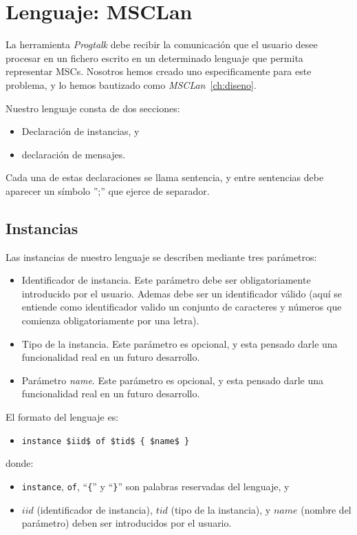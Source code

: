 \chapter{Lenguaje: MSCLan}
\label{ch:lenguaje}

La herramienta \textit{Progtalk} debe recibir la comunicación que el
usuario desee procesar en un fichero escrito en un determinado
lenguaje que permita representar MSCs. Nosotros hemos creado uno
especificamente para este problema, y lo hemos bautizado como
\textit{MSCLan}~\ref{ch:diseno}.

Nuestro lenguaje consta de dos secciones:
\begin{itemize}
\item Declaración de instancias, y
\item declaración de mensajes.
\end{itemize}

Cada una de estas declaraciones se llama sentencia, y entre sentencias
debe aparecer un símbolo '';'' que ejerce de separador.

\section{Instancias}\label{sec:Instancias}

Las instancias de nuestro lenguaje se describen mediante tres
parámetros:

\begin{itemize}
\item Identificador de instancia. Este parámetro debe ser
  obligatoriamente introducido por el usuario. Ademas debe ser un
  identificador válido (aquí se entiende como identificador valido un
  conjunto de caracteres y números que comienza obligatoriamente por
  una letra).
\item Tipo de la instancia. Este parámetro es opcional, y esta pensado
  darle una funcionalidad real en un futuro desarrollo.
\item Parámetro \textit{name}. Este parámetro es opcional, y esta
  pensado darle una funcionalidad real en un futuro desarrollo.
\end{itemize}

El formato del lenguaje es:

\begin{itemize}
\item \lstinline[mathescape]!instance $iid$ of $tid$ { $name$ }!
\end{itemize}
donde:
\begin{itemize}
\item \lstinline{instance}, \lstinline{of}, ``\lstinline!{!'' y
    ``\lstinline!}!'' son palabras reservadas del lenguaje, y
\item $iid$ (identificador de instancia), $tid$ (tipo de la
  instancia), y $name$ (nombre del parámetro) deben ser introducidos
  por el usuario.
\end{itemize}

